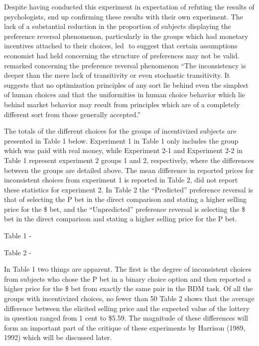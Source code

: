 \documentclass[../main.tex]{subfiles}
\begin{document}
Despite having conducted this experiment in expectation of refuting the results of psychologists, \textcite{Grether1979} end up confirming these results with their own experiment.
The lack of a substantial reduction in the proportion of subjects displaying the preference reversal phenomenon, particularly in the groups which had monetary incentives attached to their choices, led \textcite{Grether1979}⁠ to suggest that certain assumptions economist had held concerning the structure of preferences may not be valid.
\textcite[623]{Grether1979} remarked concerning the preference reversal phenomenon \enquote{The inconsistency is deeper than the mere lack of transitivity or even stochastic transitivity.
It suggests that no optimization principles of any sort lie behind even the simplest of human choices and that the uniformities in human choice behavior which lie behind market behavior may result from principles which are of a completely different sort from those generally accepted.} 

The totals of the different choices for the groups of incentivized subjects are presented in Table 1 below.
Experiment 1 in Table 1 only includes the group which was paid with real money, while Experiment 2-1 and Experiment 2-2 in Table 1 represent experiment 2 groups 1 and 2, respectively,  where the differences between the groups are detailed above.
The mean difference in reported prices for inconsistent choices from experiment 1 is reported in Table 2, \textcite{Grether1979} did not report these statistics for experiment 2.
In Table 2 the \enquote{Predicted} preference reversal is that of selecting the P bet in the direct comparison and stating a higher selling price for the \$ bet, and the \enquote{Unpredicted} preference reversal is selecting the \$ bet in the direct comparison and stating a higher selling price for the P bet.

Table 1 - \textcite{Grether1979} 





Table 2 - \textcite{Grether1979}


In Table 1 two things are apparent.
The first is the degree of inconsistent choices from subjects who chose the P bet in a binary choice option and then reported a higher price for the \$ bet from exactly the same pair in the BDM task.
Of all the groups with incentivized choices, no fewer than 50%
Table 2 shows that the average difference between the elicited selling price and the expected value of the lottery in question ranged from 1 cent to \$5.59.
The magnitude of these differences will form an important part of the critique of these experiments by Harrison (1989, 1992)⁠ which will be discussed later.
\end{document}

